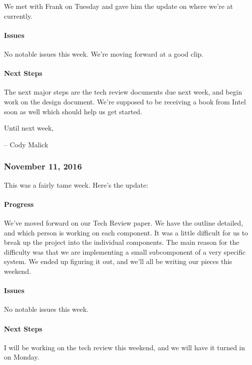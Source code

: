 \documentclass[10pt,onecolumn,journal,draftclsnofoot]{IEEEtran}
\begin{document}
We met with Frank on Tuesday and gave him the update on where we're at
currently.

\paragraph{Issues} 

No notable issues this week. We're moving forward at a good clip.

\paragraph{Next Steps} 

The next major steps are the tech review documents due next week, and
begin work on the design document. We're supposed to be receiving a book
from Intel soon as well which should help us get started.

Until next week,

-- Cody Malick

\subsubsection{November 11, 2016} 

This was a fairly tame week. Here's the update:

\paragraph{Progress} 

We've moved forward on our Tech Review paper. We have the outline
detailed, and which person is working on each component. It was a little
difficult for us to break up the project into the individual components.
The main reason for the difficulty was that we are implementing a small
subcomponent of a very specific system. We ended up figuring it out, and
we'll all be writing our pieces this weekend.

\paragraph{Issues} 

No notable issues this week.

\paragraph{Next Steps} 

I will be working on the tech review this weekend, and we will have it
turned in on Monday.
\end{document}
